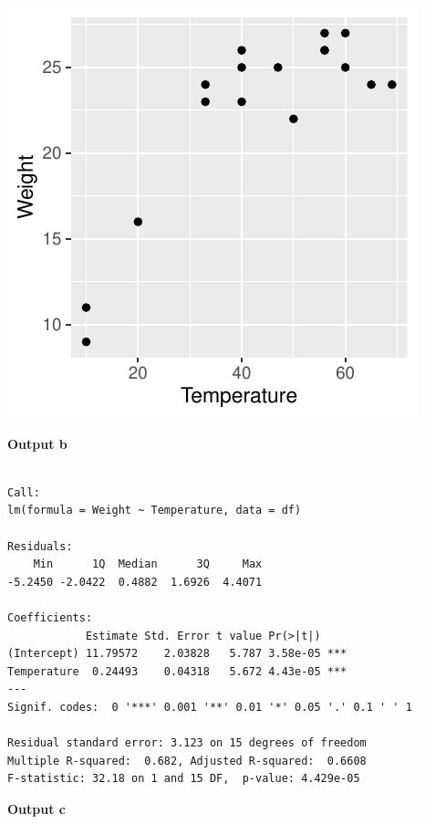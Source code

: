 \documentclass[]{article}
\begin{document}
\includegraphics{modelquestions_discussions_files/figure-latex/unnamed-chunk-2-1.pdf}

\textbf{Output b}

\begin{verbatim}

Call:
lm(formula = Weight ~ Temperature, data = df)

Residuals:
    Min      1Q  Median      3Q     Max 
-5.2450 -2.0422  0.4882  1.6926  4.4071 

Coefficients:
            Estimate Std. Error t value Pr(>|t|)    
(Intercept) 11.79572    2.03828   5.787 3.58e-05 ***
Temperature  0.24493    0.04318   5.672 4.43e-05 ***
---
Signif. codes:  0 '***' 0.001 '**' 0.01 '*' 0.05 '.' 0.1 ' ' 1

Residual standard error: 3.123 on 15 degrees of freedom
Multiple R-squared:  0.682, Adjusted R-squared:  0.6608 
F-statistic: 32.18 on 1 and 15 DF,  p-value: 4.429e-05
\end{verbatim}

\textbf{Output c}
\end{document}

